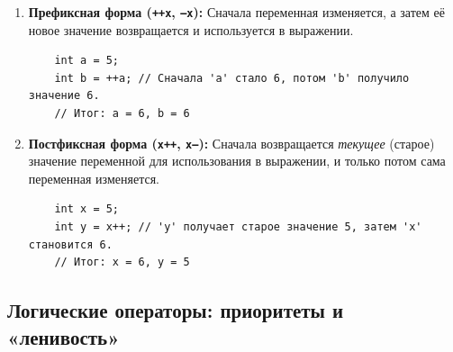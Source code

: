 \documentclass[a4paper, 12pt]{article}
\newcommand{\term}[1]{\textbf{#1}} %
\newcommand{\code}[1]{\texttt{#1}} %
\begin{document}
\begin{enumerate}
    \item \term{Префиксная форма (\code{++x}, \code{--x}):} Сначала переменная изменяется, а затем её новое значение возвращается и используется в выражении.
    \begin{verbatim}
    int a = 5;
    int b = ++a; // Сначала 'a' стало 6, потом 'b' получило значение 6.
    // Итог: a = 6, b = 6
    \end{verbatim}
    
    \item \term{Постфиксная форма (\code{x++}, \code{x--}):} Сначала возвращается \textit{текущее} (старое) значение переменной для использования в выражении, и только потом сама переменная изменяется.
    \begin{verbatim}
    int x = 5;
    int y = x++; // 'y' получает старое значение 5, затем 'x' становится 6.
    // Итог: x = 6, y = 5
    \end{verbatim}
\end{enumerate}

\subsection*{Логические операторы: приоритеты и «ленивость»}
\end{document}

